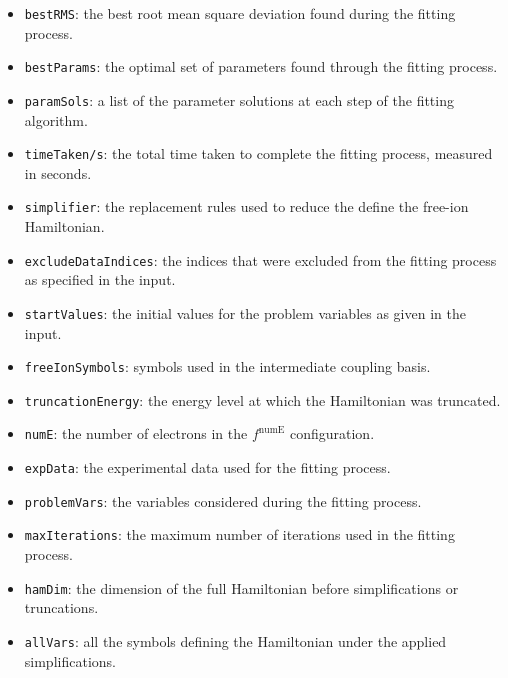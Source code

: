 \documentclass{article}
\newcommand{\codetext}[1]{{\color{BlueViolet} \texttt{#1}}}
\begin{document}
\begin{itemize}
    \item \codetext{bestRMS}: the best root mean square deviation found during the fitting process.

    \item \codetext{bestParams}: the optimal set of parameters found through the fitting process.

    \item \codetext{paramSols}: a list of the parameter solutions at each step of the fitting algorithm.

    \item \codetext{timeTaken/s}: the total time taken to complete the fitting process, measured in seconds.

    \item \codetext{simplifier}: the replacement rules used to reduce the define the free-ion Hamiltonian.

    \item \codetext{excludeDataIndices}: the indices that were excluded from the fitting process as specified in the input.

    \item \codetext{startValues}: the initial values for the problem variables as given in the input.

    \item \codetext{freeIonSymbols}: symbols used in the intermediate coupling basis.

    \item \codetext{truncationEnergy}: the energy level at which the Hamiltonian was truncated.

    \item \codetext{numE}: the number of electrons in the $f^{\text{numE}}$ configuration.

    \item \codetext{expData}: the experimental data used for the fitting process. 

    \item \codetext{problemVars}: the variables considered during the fitting process.

    \item \codetext{maxIterations}: the maximum number of iterations used in the fitting process.

    \item \codetext{hamDim}: the dimension of the full Hamiltonian before simplifications or truncations.

    \item \codetext{allVars}: all the symbols defining the Hamiltonian under the applied simplifications.


\end{itemize}
\end{document}
